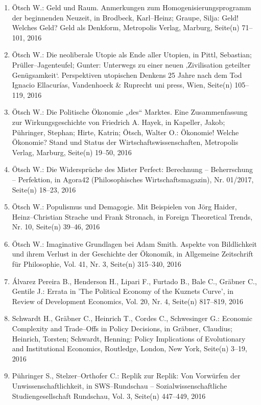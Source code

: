 \begin{enumerate}
    	 \item Ötsch W.: Geld und Raum. Anmerkungen zum Homogenisierungsprogramm der beginnenden Neuzeit, in Brodbeck, Karl--Heinz; Graupe, Silja: Geld! Welches Geld? Geld als Denkform, Metropolis Verlag, Marburg, Seite(n) 71--101, 2016
	 \item Ötsch W.: Die neoliberale Utopie als Ende aller Utopien, in Pittl, Sebastian; Prüller--Jagenteufel; Gunter: Unterwegs zu einer neuen ‚Zivilisation geteilter Genügsamkeit‘. Perspektiven utopischen Denkens 25 Jahre nach dem Tod Ignacio Ellacurías, Vandenhoeck \& Ruprecht uni press, Wien, Seite(n) 105--119, 2016
	 \item Ötsch W.: Die Politische Ökonomie „des“ Marktes. Eine Zusammenfassung zur Wirkungsgeschichte von Friedrich A. Hayek, in Kapeller, Jakob; Pühringer, Stephan; Hirte, Katrin; Ötsch, Walter O.: Ökonomie! Welche Ökonomie? Stand und Status der Wirtschaftswissenschaften, Metropolis Verlag, Marburg, Seite(n) 19--50, 2016
	 \item Ötsch W.: Die Widersprüche des Mister Perfect: Berechnung – Beherrschung – Perfektion, in Agora42 (Philosophisches Wirtschaftsmagazin), Nr. 01/2017, Seite(n) 18--23, 2016
	 \item Ötsch W.: Populismus und Demagogie. Mit Beispielen von Jörg Haider, Heinz–Christian Strache und Frank Stronach, in Foreign Theoretical Trends, Nr. 10, Seite(n) 39--46, 2016
	 \item Ötsch W.: Imaginative Grundlagen bei Adam Smith. Aspekte von Bildlichkeit und ihrem Verlust in der Geschichte der Ökonomik, in Allgemeine Zeitschrift für Philosophie, Vol. 41, Nr. 3, Seite(n) 315--340, 2016
	 \item Álvarez Pereira B., Henderson H., Lipari F., Furtado B., Bale C., Gräbner C., Gentile J.: Errata in 'The Political Economy of the Kuznets Curve', in Review of Development Economics, Vol. 20, Nr. 4, Seite(n) 817--819, 2016
	 \item Schwardt H., Gräbner C., Heinrich T., Cordes C., Schwesinger G.: Economic Complexity and Trade--Offs in Policy Decisions, in Gräbner, Claudius; Heinrich, Torsten; Schwardt, Henning: Policy Implications of Evolutionary and Institutional Economics, Routledge, London, New York, Seite(n) 3--19, 2016
	 \item Pühringer S., Stelzer--Orthofer C.: Replik zur Replik: Von Vorwürfen der Unwissenschaftlichkeit, in SWS--Rundschau -- Sozialwissenschaftliche Studiengesellschaft Rundschau, Vol. 3, Seite(n) 447--449, 2016

\end{enumerate}
